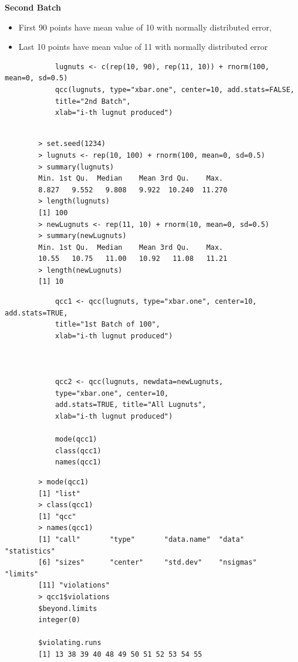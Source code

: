 \documentclass[]{report}
\begin{document}
		\newpage
		{
			\large
			\textbf{Second Batch }
			\begin{itemize}
				\item First 90 points have mean value of 10 with normally distributed error,
				\item Last 10 points have mean value of 11 with normally distributed error
			\end{itemize}
		}
		\begin{framed}
			\begin{verbatim}
			lugnuts <- c(rep(10, 90), rep(11, 10)) + rnorm(100, mean=0, sd=0.5)
			qcc(lugnuts, type="xbar.one", center=10, add.stats=FALSE,
			title="2nd Batch", 
			xlab="i-th lugnut produced")
			
			\end{verbatim}
		\end{framed}
		\newpage 
		
		\begin{verbatim}
		> set.seed(1234)
		> lugnuts <- rep(10, 100) + rnorm(100, mean=0, sd=0.5)
		> summary(lugnuts)
		Min. 1st Qu.  Median    Mean 3rd Qu.    Max. 
		8.827   9.552   9.808   9.922  10.240  11.270 
		> length(lugnuts)
		[1] 100
		> newLugnuts <- rep(11, 10) + rnorm(10, mean=0, sd=0.5)
		> summary(newLugnuts)
		Min. 1st Qu.  Median    Mean 3rd Qu.    Max. 
		10.55   10.75   11.00   10.92   11.08   11.21 
		> length(newLugnuts)
		[1] 10
		\end{verbatim}
		
		\begin{framed}
			\begin{verbatim}
			qcc1 <- qcc(lugnuts, type="xbar.one", center=10, add.stats=TRUE,
			title="1st Batch of 100", 
			xlab="i-th lugnut produced")
			
			
			
			qcc2 <- qcc(lugnuts, newdata=newLugnuts,
			type="xbar.one", center=10, 
			add.stats=TRUE, title="All Lugnuts", 
			xlab="i-th lugnut produced")
			
			mode(qcc1)
			class(qcc1)
			names(qcc1)
			\end{verbatim}
		\end{framed}
		
		\begin{verbatim}
		> mode(qcc1)
		[1] "list"
		> class(qcc1)
		[1] "qcc"
		> names(qcc1)
		[1] "call"       "type"       "data.name"  "data"       "statistics"
		[6] "sizes"      "center"     "std.dev"    "nsigmas"    "limits"    
		[11] "violations"
		> qcc1$violations
		$beyond.limits
		integer(0)
		
		$violating.runs
		[1] 13 38 39 40 48 49 50 51 52 53 54 55
		\end{verbatim}
		
\end{document}
